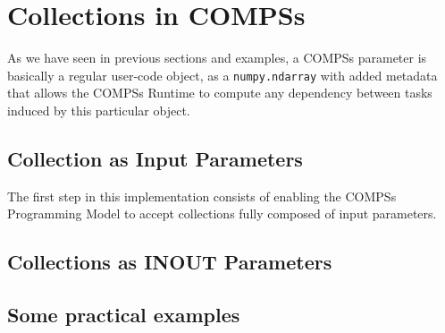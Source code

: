 \section{Collections in COMPSs}
\label{sec:col}
As we have seen in previous sections and examples, a COMPSs parameter is basically a regular user-code object, as a \verb|numpy.ndarray| with added metadata that allows the COMPSs Runtime to compute any dependency between tasks induced by this particular object.

\subsection{Collection as Input Parameters}
\label{subsec:col_in}
The first step in this implementation consists of enabling the COMPSs Programming Model to accept collections fully composed of input parameters.

\subsection{Collections as INOUT Parameters}
\label{subsec:col_inout}

\subsection{Some practical examples}
\label{subsec:col_examples}
